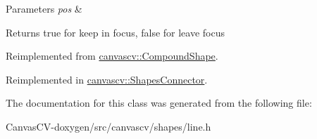 \begin{DoxyParams}{Parameters}
{\em pos} & \\
\hline
\end{DoxyParams}
\begin{DoxyReturn}{Returns}
true for keep in focus, false for leave focus 
\end{DoxyReturn}


Reimplemented from \hyperlink{classcanvascv_1_1CompoundShape_a01cf027fd5f7ec96525949d0c8ae08a1}{canvascv\+::\+Compound\+Shape}.



Reimplemented in \hyperlink{classcanvascv_1_1ShapesConnector_a56ab827f3d72e495ccfd1101807413f8}{canvascv\+::\+Shapes\+Connector}.



The documentation for this class was generated from the following file\+:\begin{DoxyCompactItemize}
\item 
Canvas\+C\+V-\/doxygen/src/canvascv/shapes/line.\+h\end{DoxyCompactItemize}
